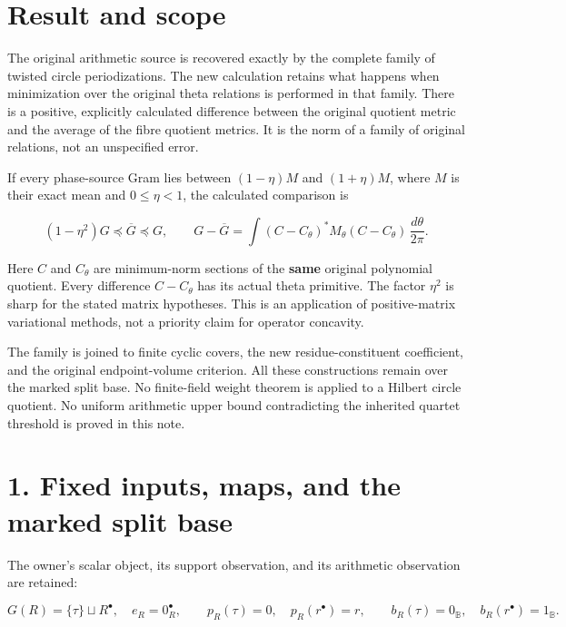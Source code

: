 


\section{Result and scope}\label{result-and-scope}

The original arithmetic source is recovered exactly by the complete
family of twisted circle periodizations. The new calculation retains
what happens when minimization over the original theta relations is
performed in that family. There is a positive, explicitly calculated
difference between the original quotient metric and the average of the
fibre quotient metrics. It is the norm of a family of original
relations, not an unspecified error.

If every phase-source Gram lies between \((1-\eta)M\) and \((1+\eta)M\),
where \(M\) is their exact mean and \(0\leq\eta<1\), the calculated
comparison is

\[
 (1-\eta^2)G\preceq \overline G\preceq G,
 \qquad
 G-\overline G
 =\int (C-C_\theta)^*M_\theta(C-C_\theta)\,\frac{d\theta}{2\pi}.
 \tag{H1}
\]

Here \(C\) and \(C_\theta\) are minimum-norm sections of the
\textbf{same} original polynomial quotient. Every difference
\(C-C_\theta\) has its actual theta primitive. The factor \(\eta^2\) is
sharp for the stated matrix hypotheses. This is an application of
positive-matrix variational methods, not a priority claim for operator
concavity.

The family is joined to finite cyclic covers, the new
residue-constituent coefficient, and the original endpoint-volume
criterion. All these constructions remain over the marked split base. No
finite-field weight theorem is applied to a Hilbert circle quotient. No
uniform arithmetic upper bound contradicting the inherited quartet
threshold is proved in this note.

\section{1. Fixed inputs, maps, and the marked split
base}\label{fixed-inputs-maps-and-the-marked-split-base}

The owner's scalar object, its support observation, and its arithmetic
observation are retained:

\[
 G(R)=\{\tau\}\sqcup R^\bullet,\quad e_R=0_R^\bullet,\qquad
 p_R(\tau)=0,\quad p_R(r^\bullet)=r,\qquad
 b_R(\tau)=0_{\mathbb B},\quad b_R(r^\bullet)=1_{\mathbb B}.
 \tag{H2}
\]

